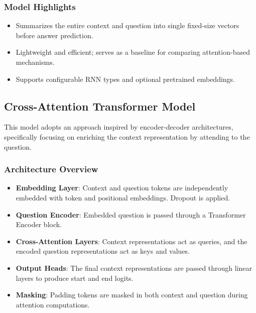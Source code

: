 \documentclass[runningheads]{llncs}
\begin{document}
\subsubsection{Model Highlights}
\begin{itemize}
    \item Summarizes the entire context and question into single fixed-size vectors before answer prediction.
    \item Lightweight and efficient; serves as a baseline for comparing attention-based mechanisms.
    \item Supports configurable RNN types and optional pretrained embeddings.
\end{itemize}

\subsection{Cross-Attention Transformer Model}

This model adopts an approach inspired by encoder-decoder architectures, specifically focusing on enriching the context representation by attending to the question.

\subsubsection{Architecture Overview}
\begin{itemize}
    \item \textbf{Embedding Layer}: Context and question tokens are independently embedded with token and positional embeddings. Dropout is applied.
    \item \textbf{Question Encoder}: Embedded question is passed through a Transformer Encoder block.
    \item \textbf{Cross-Attention Layers}: Context representations act as queries, and the encoded question representations act as keys and values.
    \item \textbf{Output Heads}: The final context representations are passed through linear layers to produce start and end logits.
    \item \textbf{Masking}: Padding tokens are masked in both context and question during attention computations.
\end{itemize}
\end{document}
